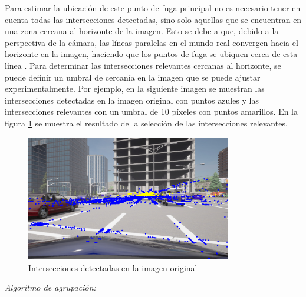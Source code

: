 Para estimar la ubicación de este punto de fuga principal no es necesario tener en cuenta todas las intersecciones detectadas,
sino solo aquellas que se encuentran en una zona cercana al horizonte de la imagen.
Esto se debe a que, debido a la perspectiva de la cámara, las líneas paralelas en el mundo real convergen hacia el horizonte en la imagen,
haciendo que los puntos de fuga se ubiquen cerca de esta línea \cite{hartley2003multiple}.
Para determinar las intersecciones relevantes cercanas al horizonte, se puede definir un umbral de cercanía en la imagen que se puede ajustar experimentalmente.
Por ejemplo, en la siguiente imagen se muestran las intersecciones detectadas en la imagen original con puntos azules
y las intersecciones relevantes con un umbral de 10 píxeles con puntos amarillos.
En la figura \ref{fig:relevantInter} se muestra el resultado de la selección de las intersecciones relevantes. \\
\begin{figure}[!ht]
    \centering
    \includegraphics[width=0.8\textwidth]{img/reticule/relevantInter}
    \caption{Intersecciones detectadas en la imagen original}
    \label{fig:relevantInter}
\end{figure}

\textit{Algoritmo de agrupación:}\\

